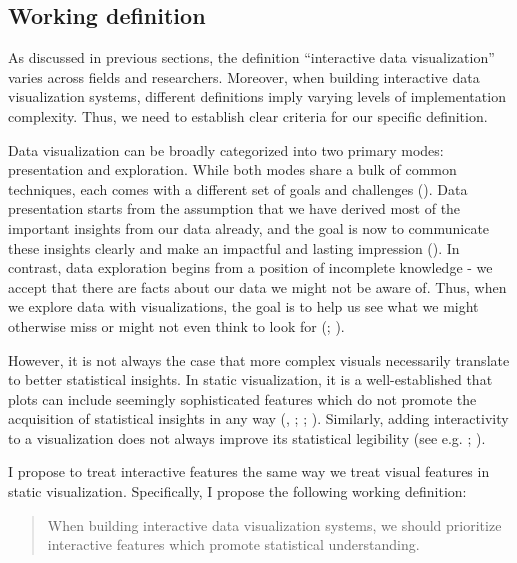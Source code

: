 \documentclass[
]{book}
\begin{document}
\subsection{Working definition}\label{working-definition}

As discussed in previous sections, the definition ``interactive data visualization'' varies across fields and researchers. Moreover, when building interactive data visualization systems, different definitions imply varying levels of implementation complexity. Thus, we need to establish clear criteria for our specific definition.

Data visualization can be broadly categorized into two primary modes: presentation and exploration. While both modes share a bulk of common techniques, each comes with a different set of goals and challenges (). Data presentation starts from the assumption that we have derived most of the important insights from our data already, and the goal is now to communicate these insights clearly and make an impactful and lasting impression (). In contrast, data exploration begins from a position of incomplete knowledge - we accept that there are facts about our data we might not be aware of. Thus, when we explore data with visualizations, the goal is to help us see what we might otherwise miss or might not even think to look for (; ).

However, it is not always the case that more complex visuals necessarily translate to better statistical insights. In static visualization, it is a well-established that plots can include seemingly sophisticated features which do not promote the acquisition of statistical insights in any way (, ; ; ). Similarly, adding interactivity to a visualization does not always improve its statistical legibility (see e.g. ; ).

I propose to treat interactive features the same way we treat visual features in static visualization. Specifically, I propose the following working definition:

\begin{quote}
When building interactive data visualization systems, we should prioritize interactive features which promote statistical understanding.
\end{quote}
\end{document}
